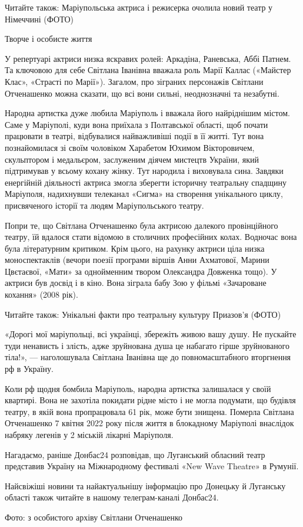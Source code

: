 Читайте також: Маріупольська актриса і режисерка очолила новий театр у
Німеччині (ФОТО)

Творче і особисте життя

У репертуарі актриси низка яскравих ролей: Аркадіна, Раневська, Аббі Патнем. Та
ключовою для себе Світлана Іванівна вважала роль Марії Каллас («Майстер Клас»,
«Страсті по Марії»). Загалом, про зіграних персонажів Світлани Отченашенко
можна сказати, що всі вони сильні, неоднозначні та незабутні.

Народна артистка дуже любила Маріуполь і вважала його найріднішим містом. Саме
у Маріуполі, куди вона приїхала з Полтавської області, щоб почати працювати в
театрі, відбувалися найважливіші події в її житті. Тут вона познайомилася зі
своїм чоловіком Харабетом Юхимом Вікторовичем, скульптором і медальєром,
заслуженим діячем мистецтв України, який підтримував у всьому кохану жінку. Тут
народила і виховувала сина. Завдяки енергійній діяльності актриса змогла
зберегти історичну театральну спадщину Маріуполя, надихнувши телеканал «Сигма»
на створення унікального циклу, присвяченого історії та людям Маріупольського
театру.

Попри те, що Світлана Отченашенко була актрисою далекого провінційного театру,
їй вдалося стати відомою в столичних професійних колах. Водночас вона була
літературним критиком. Крім цього, на рахунку актриси ціла низка моноспектаклів
(вечори поезії програми віршів Анни Ахматової, Марини Цвєтаєвої, «Мати» за
однойменним твором Олександра Довженка тощо). У актриси був досвід і в кіно.
Вона зіграла бабу Зою у фільмі «Зачароване кохання» (2008 рік).

Читайте також: Унікальні факти про театральну культуру Приазов’я (ФОТО)

«Дорогі мої маріупольці, всі українці, збережіть живою вашу душу. Не пускайте
туди ненависть і злість, адже зруйнована душа це набагато гірше зруйнованого
тіла!», — наголошувала Світлана Іванівна ще до повномасштабного вторгнення рф в
Україну.

Коли рф щодня бомбила Маріуполь, народна артистка залишалася у своїй квартирі.
Вона не захотіла покидати рідне місто і не могла подумати, що будівля театру, в
якій вона пропрацювала 61 рік, може бути знищена. Померла Світлана Отченашенко
7 квітня 2022 року після життя в блокадному Маріуполі внаслідок набряку легенів
у 2 міській лікарні Маріуполя.

Нагадаємо, раніше Донбас24 розповідав, що Луганський обласний театр представив
Україну на Міжнародному фестивалі «New Wave Theatre» в Румунії.

Найсвіжіші новини та найактуальнішу інформацію про Донецьку й Луганську області
також читайте в нашому телеграм-каналі Донбас24.

Фото: з особистого архіву Світлани Отченашенко
